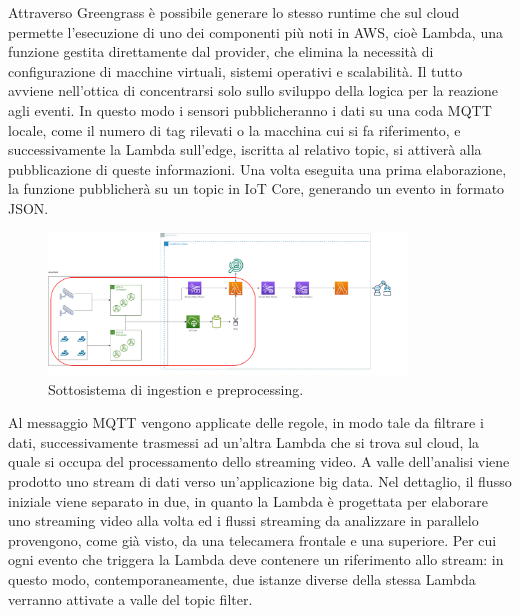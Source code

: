 Attraverso Greengrass è possibile generare lo stesso runtime che sul cloud permette l’esecuzione di uno dei componenti più noti in AWS, cioè Lambda, una funzione gestita direttamente dal provider, che elimina la necessità di configurazione di macchine virtuali, sistemi operativi e scalabilità. Il tutto avviene nell’ottica di concentrarsi solo sullo sviluppo della logica per la reazione agli eventi. In questo modo i sensori pubblicheranno i dati su una coda MQTT locale, come il numero di tag rilevati o la macchina cui si fa riferimento, e successivamente la Lambda sull'edge, iscritta al relativo topic, si attiverà alla pubblicazione di queste informazioni. Una volta eseguita una prima elaborazione, la funzione pubblicherà su un topic in IoT Core, generando un evento in formato JSON. 

\begin{figure}[htbp]
    \centering
    \includegraphics[width=0.85\textwidth]{figures/sottosistema-ingestion.png}
    \caption{Sottosistema di ingestion e preprocessing.} 
    \label{fig:sub-ing}
\end{figure}

Al messaggio MQTT vengono applicate delle regole, in modo tale da filtrare i dati, successivamente trasmessi ad un’altra Lambda che si trova sul cloud, la quale si occupa del processamento dello streaming video. A valle dell’analisi viene prodotto uno stream di dati verso un’applicazione big data. Nel dettaglio, il flusso iniziale viene separato in due, in quanto la Lambda è progettata per elaborare uno streaming video alla volta ed i flussi streaming da analizzare in parallelo provengono, come già visto, da una telecamera frontale e una superiore. Per cui ogni evento che triggera la Lambda deve contenere un riferimento allo stream: in questo modo, contemporaneamente, due istanze diverse della stessa Lambda verranno attivate a valle del topic filter. 

